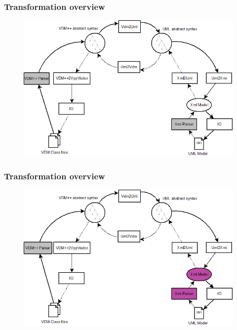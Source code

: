 %
%
\frame
{
  \frametitle{Transformation overview}
\begin{center}
\begin{figure}
\includegraphics[width=\textwidth]{images/OverviewOverMapping.png}
\end{figure}
\end{center}
}
%
%
\frame
{
  \frametitle{Transformation overview}
\begin{center}
\begin{figure}
\includegraphics[width=\textwidth]{images/OverviewOverMappingToUML1.png}
\end{figure}
\end{center}
}
%
%
\frame
